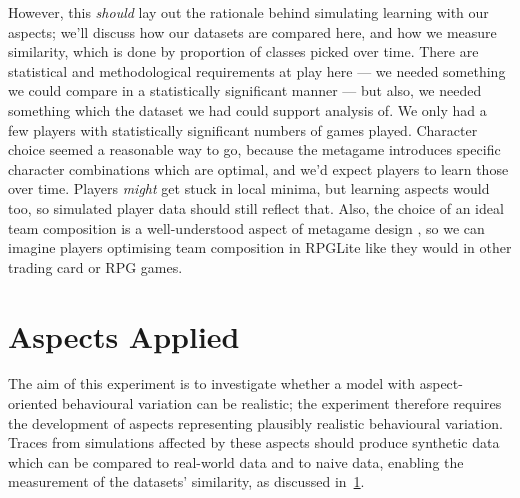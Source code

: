 However, this \emph{should} lay out the rationale behind simulating learning
with our aspects; we'll discuss how our datasets are compared here, and how we
measure similarity, which is done by proportion of classes picked over time.
There are statistical and methodological requirements at play here --- we needed
something we could compare in a statistically significant manner --- but also,
we needed something which the dataset we had could support analysis of. We only
had a few players with statistically significant numbers of games played.
Character choice seemed a reasonable way to go, because the metagame introduces
specific character combinations which are optimal, and we'd expect players to
learn those over time. Players \emph{might} get stuck in local minima, but
learning aspects would too, so simulated player data should still reflect that.
Also, the choice of an ideal team composition is a well-understood aspect of
metagame design , so we can
imagine players optimising team composition in RPGLite like they would in other
trading card or RPG games.


\section{Aspects Applied}\label{sec:optimisation_with_aspects_aspectsdeveloped}



The aim of this experiment is to investigate whether a model with
aspect-oriented behavioural variation can be realistic; the experiment therefore
requires the development of aspects representing plausibly realistic behavioural
variation. Traces from simulations affected by these aspects should produce
synthetic data which can be compared to real-world data and to naive data,
enabling the measurement of the datasets' similarity, as discussed
in~\cref{sec:optimisation_with_aspects_aspectsdeveloped}. 

